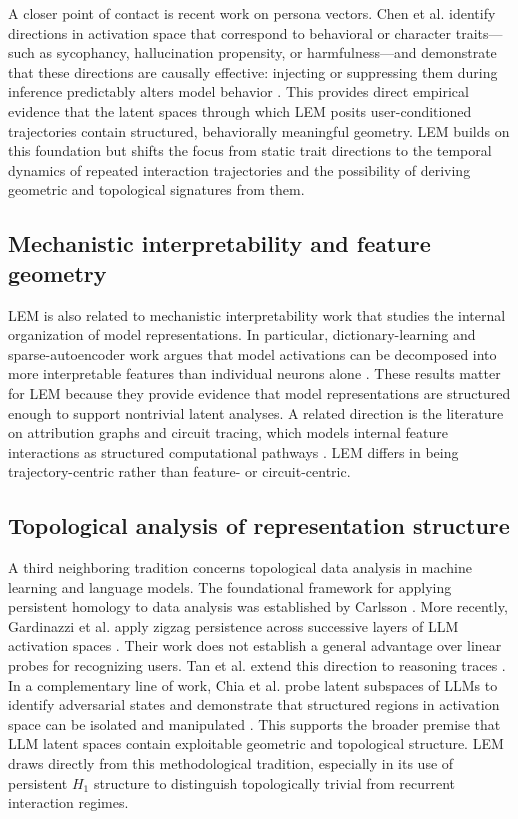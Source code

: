 \documentclass[11pt]{article}
\begin{document}
A closer point of contact is recent work on persona vectors. Chen et al. identify
directions in activation space that correspond to behavioral or character
traits---such as sycophancy, hallucination propensity, or harmfulness---and
demonstrate that these directions are causally effective: injecting or suppressing
them during inference predictably alters model behavior \cite{chen2025persona}. This
provides direct empirical evidence that the latent spaces through which LEM posits
user-conditioned trajectories contain structured, behaviorally meaningful geometry.
LEM builds on this foundation but shifts the focus from static trait directions to
the temporal dynamics of repeated interaction trajectories and the possibility of
deriving geometric and topological signatures from them.

\subsection{Mechanistic interpretability and feature geometry}

LEM is also related to mechanistic interpretability work that studies the internal
organization of model representations. In particular, dictionary-learning and
sparse-autoencoder work argues that model activations can be decomposed into more
interpretable features than individual neurons alone
\cite{bricken2023monosemanticity,templeton2024scaling}. These results matter for LEM
because they provide evidence that model representations are structured enough to
support nontrivial latent analyses. A related direction is the literature on
attribution graphs and circuit tracing, which models internal feature interactions
as structured computational pathways \cite{ameisen2025circuittracing}. LEM differs
in being trajectory-centric rather than feature- or circuit-centric.

\subsection{Topological analysis of representation structure}

A third neighboring tradition concerns topological data analysis in machine learning
and language models. The foundational framework for applying persistent homology to
data analysis was established by Carlsson \cite{carlsson2009topology}. More recently,
Gardinazzi et al. apply zigzag persistence across successive layers of LLM
activation spaces \cite{gardinazzi2024persistent}. Their work does not establish
a general advantage over linear probes for recognizing users. Tan
et al. extend this direction to reasoning traces \cite{tan2025shape}. In a
complementary line of work, Chia et al. probe latent subspaces of LLMs to identify
adversarial states and demonstrate that structured regions in activation space can be
isolated and manipulated \cite{chia2025probing}. This supports the broader premise
that LLM latent spaces contain exploitable geometric and topological structure. LEM
draws directly from this methodological tradition, especially in its use of persistent
$H_1$ structure to distinguish topologically trivial from recurrent interaction
regimes.
\end{document}
